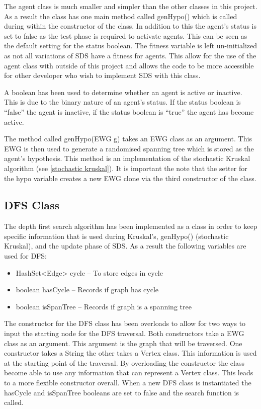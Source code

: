 \documentclass{AISB2008}
\begin{document}
{The agent class is much smaller and simpler than the other classes in this project. As a result the class has one main method called genHypo() which is called during within the constructor of the class. In addition to this the agent’s status is set to false as the test phase is required to activate agents. This can be seen as the default setting for the status boolean. The fitness variable is left un-initialized as not all variations of SDS have a fitness for agents. This allow for the use of the agent class with outside of this project and allows the code to be more accessible for other developer who wish to implement SDS with this class.

A boolean has been used to determine whether an agent is active or inactive. This is due to the binary nature of an agent’s status. If the status boolean is “false” the agent is inactive, if the status boolean is “true” the agent has become active.

The method called genHypo(EWG g) takes an EWG class as an argument. This EWG is then used to generate a randomised spanning tree which is stored as the agent’s hypothesis. This method is an implementation of the stochastic Kruskal algorithm (see \ref{stochastic kruskal}).
It is important the note that the setter for the hypo variable creates a new EWG clone via the third constructor of the class.


\subsection{DFS Class}

The depth first search algorithm has been implemented as a class in order to keep specific information that is used during Kruskal’s, genHypo() (stochastic Kruskal), and the update phase of SDS. As a result the following variables are used for DFS:

\begin{itemize}
\item HashSet<Edge> cycle – To store edges in cycle
\item boolean hasCycle – Records if graph has cycle
\item boolean isSpanTree – Records if graph is a spanning tree 
\end{itemize}

The constructor for the DFS class has been overloads to allow for two ways to input the starting node for the DFS traversal. Both constructors take a EWG class as an argument. This argument is the graph that will be traversed. One constructor takes a String the other takes a Vertex class. This information is used at the starting point of the traversal. By overloading the constructor the class become able to use any information that can represent a Vertex class. This leads to a more flexible constructor overall. When a new DFS class is instantiated the hasCycle and isSpanTree booleans are set to false and the search function is called.

}
\end{document}
